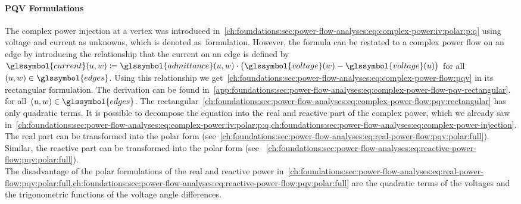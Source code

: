 \paragraph{PQV Formulations}
\label{ch:foundations:pqv-formulations}
% 
The complex power injection at a vertex was introduced
in~\cref{ch:foundations:sec:power-flow-analyses:eq:complex-power:iv:polar:p:q}
using voltage and current as unknowns, which is denoted as~\iv formulation.
However, the formula can be restated to a complex power flow on an edge by
introducing the relationship that the current on an edge is defined
by~$
    \glssymbol{current}(\vertexa,\vertexc)
    \coloneqq
    \glssymbol{admittance}(\vertexa,\vertexc)
    \cdot
    \big(
        \glssymbol{voltage}(\vertexc) 
        - 
        \glssymbol{voltage}(\vertexa)
    \big)
$ for all~$(\vertexa,\vertexc)\in\glssymbol{edges}$. Using this relationship we
get~\cref{ch:foundations:sec:power-flow-analyses:eq:complex-power-flow:pqv} in
its rectangular formulation. The derivation can be found
in~\cref{app:foundations:sec:power-flow-analyses:eq:complex-power-flow-pqv-rectangular}.
% 
\begin{subequations}
    
    \label{ch:foundations:sec:power-flow-analyses:eq:complex-power-flow:pqv}
\end{subequations}
% 
for all~$(\vertexa,\vertexc)\in\glssymbol{edges}$. The
rectangular~\cref{ch:foundations:sec:power-flow-analyses:eq:complex-power-flow:pqv:rectangular}
has only quadratic terms. It is possible to decompose the equation into the real
and reactive part of the complex power, which we already saw
in~\cref{ch:foundations:sec:power-flow-analyses:eq:complex-power:iv:polar:p:q,ch:foundations:sec:power-flow-analyses:eq:complex-power-injection}.
The real part can be transformed into the polar form
(see~\cref{ch:foundations:sec:power-flow-analyses:eq:real-power-flow:pqv:polar:full}).
% 
\begin{subequations}
    
    \label{ch:foundations:sec:power-flow-analyses:eq:real-power-flow:pqv:polar:full}
\end{subequations}
%
Similar, the reactive part can be transformed into the polar form (see~
\cref{ch:foundations:sec:power-flow-analyses:eq:reactive-power-flow:pqv:polar:full}).
% 
\begin{subequations}
    
    \label{ch:foundations:sec:power-flow-analyses:eq:reactive-power-flow:pqv:polar:full}
\end{subequations}
% 
The disadvantage of the polar formulations of the real and reactive power
in~\cref{ch:foundations:sec:power-flow-analyses:eq:real-power-flow:pqv:polar:full,ch:foundations:sec:power-flow-analyses:eq:reactive-power-flow:pqv:polar:full}
are the quadratic terms of the voltages and the trigonometric functions of the
voltage angle differences.
% 
